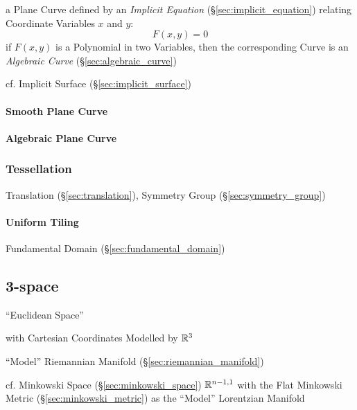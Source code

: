 a Plane Curve defined by an \emph{Implicit Equation}
(\S\ref{sec:implicit_equation}) relating Coordinate Variables $x$ and $y$:
\[
  F(x,y) = 0
\]
if $F(x,y)$ is a Polynomial in two Variables, then the corresponding Curve is an
\emph{Algebraic Curve} (\S\ref{sec:algebraic_curve})

\fist cf. Implicit Surface (\S\ref{sec:implicit_surface})



\paragraph{Smooth Plane Curve}\label{sec:smooth_plane_curve}\hfill

\paragraph{Algebraic Plane Curve}\label{sec:algebraic_plane_curve}\hfill



\subsubsection{Tessellation}\label{sec:tessellation}

\fist Translation (\S\ref{sec:translation}), Symmetry Group
(\S\ref{sec:symmetry_group})



\paragraph{Uniform Tiling}\label{sec:uniform_tiling}\hfill

Fundamental Domain (\S\ref{sec:fundamental_domain})



\subsection{3-space}\label{sec:3_space}

``Euclidean Space''

with Cartesian Coordinates Modelled by $\mathbb{R}^3$

``Model'' Riemannian Manifold (\S\ref{sec:riemannian_manifold})

cf. Minkowski Space (\S\ref{sec:minkowski_space}) $\mathbb{R}^{n-1,1}$
with the Flat Minkowski Metric (\S\ref{sec:minkowski_metric}) as the
``Model'' Lorentzian Manifold



